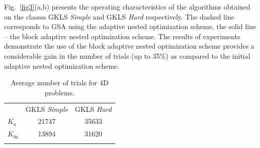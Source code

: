 \documentclass[runningheads]{llncs}
\begin{document}
Fig.~\ref{fig3}(a,b) presents the operating characteristics of the algorithms obtained on the classes GKLS \textit{Simple} 
and GKLS \textit{Hard} respectively. The dashed line corresponds to GSA using the adaptive nested optimization 
scheme, the solid line -- the block adaptive nested optimization scheme. 
The results of experiments demonstrate the use of the block adaptive nested optimization scheme provides a considerable 
gain in the number of trials (up to 35\%) as compared to the initial adaptive nested optimization scheme.

\begin{table}
\centering
\caption{Average number of trials for 4D problems.}\label{tab2}
\begin{tabular}{lcc}
\hline\noalign{\smallskip}
 &    GKLS \textit{Simple} &  GKLS \textit{Hard} \\
\noalign{\smallskip}\hline\noalign{\smallskip}
 $K_a$  &  21747 & 35633 \\
 $K_{ba}$ &  13894 & 31620 \\
\noalign{\smallskip}\hline
\end{tabular}
\end{table}
\end{document}
